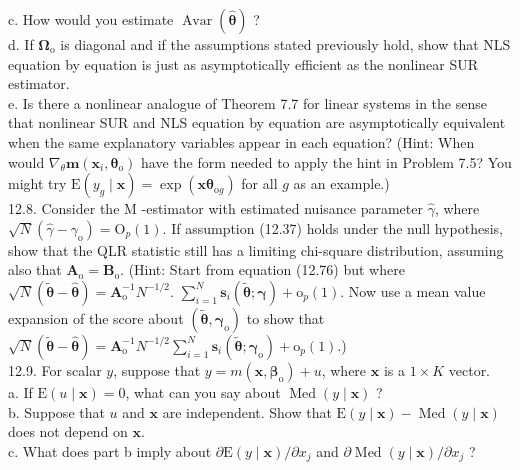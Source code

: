 \documentclass[10pt]{article}
\begin{document}
c. How would you estimate $\operatorname{Avar}(\hat{\boldsymbol{\theta}})$ ?\\
d. If $\boldsymbol{\Omega}_{\mathrm{o}}$ is diagonal and if the assumptions stated previously hold, show that NLS equation by equation is just as asymptotically efficient as the nonlinear SUR estimator.\\
e. Is there a nonlinear analogue of Theorem 7.7 for linear systems in the sense that nonlinear SUR and NLS equation by equation are asymptotically equivalent when the same explanatory variables appear in each equation? (Hint: When would $\nabla_{\theta} \mathbf{m}\left(\mathbf{x}_{i}, \boldsymbol{\theta}_{\mathrm{o}}\right)$ have the form needed to apply the hint in Problem 7.5? You might try $\mathrm{E}\left(y_{g} \mid \mathbf{x}\right)=\exp \left(\mathbf{x} \boldsymbol{\theta}_{\mathrm{o} g}\right)$ for all $g$ as an example.)\\
12.8. Consider the M -estimator with estimated nuisance parameter $\hat{\gamma}$, where $\sqrt{N}\left(\hat{\gamma}-\gamma_{\mathrm{o}}\right)=\mathrm{O}_{p}(1)$. If assumption (12.37) holds under the null hypothesis, show that the QLR statistic still has a limiting chi-square distribution, assuming also that $\mathbf{A}_{\mathrm{o}}=\mathbf{B}_{\mathrm{o}}$. (Hint: Start from equation (12.76) but where $\sqrt{N}(\tilde{\boldsymbol{\theta}}-\hat{\boldsymbol{\theta}})=\mathbf{A}_{\mathrm{o}}^{-1} N^{-1 / 2}$. $\sum_{i=1}^{N} \mathbf{s}_{i}(\tilde{\boldsymbol{\theta}} ; \hat{\boldsymbol{\gamma}})+\mathrm{o}_{p}(1)$. Now use a mean value expansion of the score about $\left(\tilde{\boldsymbol{\theta}}, \boldsymbol{\gamma}_{\mathrm{o}}\right)$ to show that $\sqrt{N}(\tilde{\boldsymbol{\theta}}-\hat{\boldsymbol{\theta}})=\mathbf{A}_{\mathrm{o}}^{-1} N^{-1 / 2} \sum_{i=1}^{N} \mathbf{s}_{i}\left(\tilde{\boldsymbol{\theta}} ; \boldsymbol{\gamma}_{\mathrm{o}}\right)+\mathrm{o}_{p}(1)$.)\\
12.9. For scalar $y$, suppose that $y=m\left(\mathbf{x}, \boldsymbol{\beta}_{\mathrm{o}}\right)+u$, where $\mathbf{x}$ is a $1 \times K$ vector.\\
a. If $\mathrm{E}(u \mid \mathbf{x})=0$, what can you say about $\operatorname{Med}(y \mid \mathbf{x})$ ?\\
b. Suppose that $u$ and $\mathbf{x}$ are independent. Show that $\mathrm{E}(y \mid \mathbf{x})-\operatorname{Med}(y \mid \mathbf{x})$ does not depend on $\mathbf{x}$.\\
c. What does part b imply about $\partial \mathrm{E}(y \mid \mathbf{x}) / \partial x_{j}$ and $\partial \operatorname{Med}(y \mid \mathbf{x}) / \partial x_{j}$ ?\\
\end{document}
